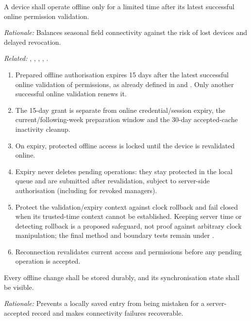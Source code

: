 \label{nfr:AOC-02}
A device shall operate offline only for a limited time after its latest successful online permission validation.

\textit{Rationale:} Balances seasonal field connectivity against the risk of lost devices and delayed revocation.

\textit{Related:} \hyperref[fr:002]{}, \hyperref[fr:003]{}, \hyperref[fr:004]{}, \hyperref[fr:005]{}, \hyperref[fr:008]{}.
\begin{enumerate}[label=(\alph*),leftmargin=*,itemsep=1pt,topsep=3pt]
\item Prepared offline authorisation expires 15 days after the latest successful online validation of permissions, as already defined in \hyperref[fr:004]{} and . Only another successful online validation renews it.
\item The 15-day grant is separate from online credential/session expiry, the current/following-week preparation window and the 30-day accepted-cache inactivity cleanup.
\item On expiry, protected offline access is locked until the device is revalidated online.
\item Expiry never deletes pending operations: they stay protected in the local queue and are submitted after revalidation, subject to server-side authorisation (including \hyperref[nfr:REL-08]{} for revoked managers).
\item Protect the validation/expiry context against clock rollback and fail closed when its trusted-time context cannot be established. Keeping server time or detecting rollback is a proposed safeguard, not proof against arbitrary clock manipulation; the final method and boundary tests remain under .
\item Reconnection revalidates current access and permissions before any pending operation is accepted.
\end{enumerate}

\label{nfr:AOC-03}
Every offline change shall be stored durably, and its synchronisation state shall be visible.

\textit{Rationale:} Prevents a locally saved entry from being mistaken for a server-accepted record and makes connectivity failures recoverable.

